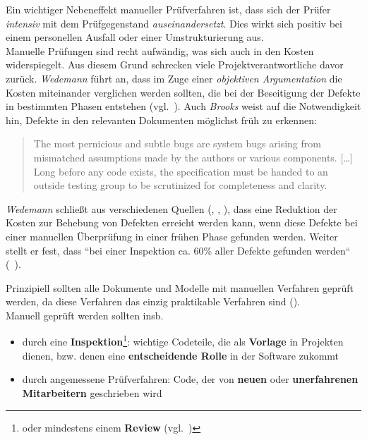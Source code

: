 \noindent
Ein wichtiger Nebeneffekt manueller Prüfverfahren ist, dass sich der Prüfer \textit{intensiv} mit dem Prüfgegenstand \textit{auseinandersetzt}.
Dies wirkt sich positiv bei einem personellen Ausfall oder einer Umstrukturierung aus.\\

\noindent
Manuelle Prüfungen sind recht aufwändig, was sich auch in den Kosten widerspiegelt.
Aus diesem Grund schrecken viele Projektverantwortliche davor zurück. \textit{Wedemann} führt an, dass im Zuge einer \textit{objektiven Argumentation} die Kosten miteinander verglichen werden sollten, die bei der Beseitigung der Defekte in bestimmten Phasen entstehen (vgl.~\cite[16]{Wed09c}).
Auch \textit{Brooks} weist auf die Notwendigkeit hin, Defekte in den relevanten Dokumenten möglichst früh zu erkennen:

\blockquote[{\cite[142]{Bro95}}]{
The most pernicious and subtle bugs are system bugs arising from mismatched assumptions made by the authors or various components. [\ldots] Long before any code exists, the specification must be handed to an outside testing group to be scrutinized for completeness and clarity.
}

\noindent
\textit{Wedemann} schließt aus verschiedenen Quellen (\cite{Rad01}, \cite{Wie02}, \cite{GG93}), dass eine Reduktion der Kosten zur Behebung von Defekten erreicht werden kann, wenn diese Defekte bei einer manuellen Überprüfung in einer frühen Phase gefunden werden.
Weiter stellt er fest,  dass ``bei einer Inspektion ca. 60{\%} aller Defekte gefunden werden`` (~\cite[16]{Wed09c}).\\

\begin{tcolorbox}
Prinzipiell sollten alle Dokumente und Modelle mit manuellen Verfahren geprüft werden, da diese Verfahren das einzig praktikable Verfahren sind (\cite[16]{Wed09c}).\\
Manuell geprüft werden sollten insb.

\begin{itemize}
    \item durch eine \textbf{Inspektion}\footnote{
    oder mindestens einem \textbf{Review} (vgl.~\cite[Aufgabe 3.8, 83]{Wed09c})
    }: wichtige Codeteile, die als \textbf{Vorlage} in Projekten dienen, bzw. denen eine \textbf{entscheidende Rolle} in der Software zukommt
    \item durch angemessene Prüfverfahren: Code, der von \textbf{neuen} oder \textbf{unerfahrenen Mitarbeitern} geschrieben wird
\end{itemize}
\end{tcolorbox}
\vspace{2mm}


